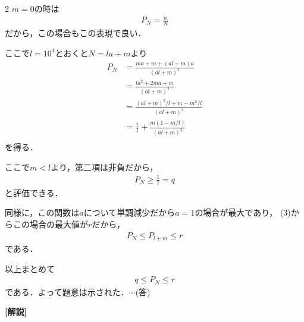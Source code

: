 \documentclass[../../../../main.tex]{subfiles}
\begin{document}
\begin{multicols}{2}
  $m=0$の時は
  \begin{align*}
    P_N = \frac{a}{N}
  \end{align*}
  だから，この場合もこの表現で良い．

  ここで$l=10^4$とおくと$N=la+m$より
  \begin{align*}
    P_{N}
     & = \frac{ma + m + (al+m)a }{(al+m)^2}       \\
     & = \frac{la^2 + 2ma + m }{(al+m)^2}         \\
     & = \frac{(al+m)^2/l + m - m^2/l}{(al+m)^2}  \\
     & = \frac{1}{l} + \frac{ m(1-m/l)}{(al+m)^2} \\
  \end{align*}
  を得る．

  ここで$m < l$より，第二項は非負だから，
  \begin{align}
    P_{N} \ge \frac{1}{l} = q
  \end{align}
  と評価できる．

  同様に，この関数は$a$について単調減少だから$a=1$の場合が最大であり，
  (3)からこの場合の最大値が$r$だから，
  \begin{align*}
    P_{N} \le P_{l+m} \le r
  \end{align*}
  である．

  以上まとめて
  \begin{align*}
    q \le P_{N} \le r
  \end{align*}
  である．よって題意は示された．$\cdots$(答)

  \vspace{10pt}
  {\bf[解説]}



  \newpage
\end{multicols}
\end{document}
